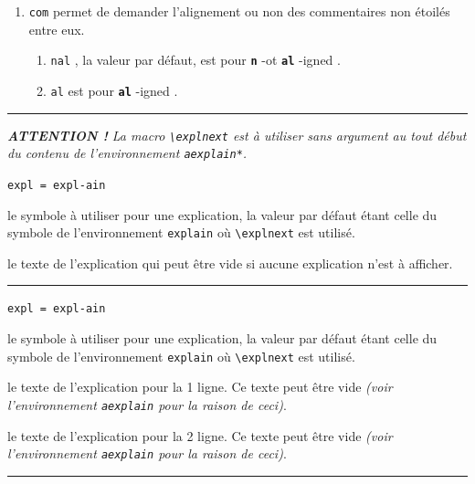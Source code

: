 \documentclass[12pt,a4paper]{book}
\newcommand\env[1]{\texttt{#1}}
\newcommand\macro[1]{\env{\textbackslash{}#1}}
\theoremstyle{definition}
\newcommand\separation{
	\medskip
	\hfill\rule{0.5\textwidth}{0.75pt}\hfill
	\medskip
}
\newcommand\extraspace{
	\vspace{0.25em}
}
\newcommand\whyprefix[2]{%
	\textbf{\prefix{#1}}-#2%
}
\newcommand\mwhyprefix[2]{%
	\texttt{#1 = #1-#2}%
}
\newcommand\prefix[1]{%
	\texttt{#1}%
}
\begin{document}
{{\begin{enumerate}
\begin{enumerate}
	      		\item \prefix{ar} est pour \whyprefix{ar}{row}.

	      		\item \prefix{sar} est pour \whyprefix{s}{hort} \whyprefix{ar}{row}.
	      \end{enumerate}

	\item \verb+com+ permet de demander l'alignement ou non des commentaires non étoilés entre eux.
	      \begin{enumerate}
	      		\item \prefix{nal}, la valeur par défaut, est pour \whyprefix{n}{ot} \whyprefix{al}{igned}.

	      		\item \prefix{al} est pour \whyprefix{al}{igned}.

	      \end{enumerate}
\end{enumerate}


\separation


\emph{\textbf{ATTENTION !} La macro \macro{explnext} est à utiliser sans argument au tout début du contenu de l'environnement \env{aexplain*}.}

\extraspace

\extraspace

 \hfill \mwhyprefix{expl}{ain}

\IDoption{} le symbole à utiliser pour une explication, la valeur par défaut étant celle du symbole de l'environnement \env{explain} où \macro{explnext} est utilisé.

\IDarg{} le texte de l'explication qui peut être vide si aucune explication n'est à afficher.


\separation


 \hfill \mwhyprefix{expl}{ain}

\IDoption{} le symbole à utiliser pour une explication, la valeur par défaut étant celle du symbole de l'environnement \env{explain} où \macro{explnext} est utilisé.

 le texte de l'explication pour la 1\iere{} ligne.
          Ce texte peut être vide \emph{(voir l'environnement \env{aexplain} pour la raison de ceci)}.

 le texte de l'explication pour la 2\ieme{} ligne.
          Ce texte peut être vide \emph{(voir l'environnement \env{aexplain} pour la raison de ceci)}.


\separation


}}
\end{document}
